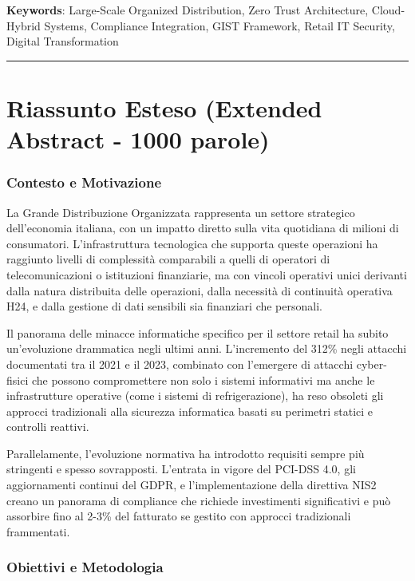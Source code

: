 \documentclass{report}
\begin{document}
\textbf{Keywords}: Large-Scale Organized Distribution, Zero Trust
Architecture, Cloud-Hybrid Systems, Compliance Integration, GIST
Framework, Retail IT Security, Digital Transformation

\begin{center}\rule{0.5\linewidth}{0.5pt}\end{center}

\section{Riassunto Esteso (Extended Abstract - 1000
parole)}\label{riassunto-esteso-extended-abstract---1000-parole}

\subsubsection{Contesto e Motivazione}\label{contesto-e-motivazione}

La Grande Distribuzione Organizzata rappresenta un settore strategico
dell'economia italiana, con un impatto diretto sulla vita quotidiana di
milioni di consumatori. L'infrastruttura tecnologica che supporta queste
operazioni ha raggiunto livelli di complessità comparabili a quelli di
operatori di telecomunicazioni o istituzioni finanziarie, ma con vincoli
operativi unici derivanti dalla natura distribuita delle operazioni,
dalla necessità di continuità operativa H24, e dalla gestione di dati
sensibili sia finanziari che personali.

Il panorama delle minacce informatiche specifico per il settore retail
ha subito un'evoluzione drammatica negli ultimi anni. L'incremento del
312\% negli attacchi documentati tra il 2021 e il 2023, combinato con
l'emergere di attacchi cyber-fisici che possono compromettere non solo i
sistemi informativi ma anche le infrastrutture operative (come i sistemi
di refrigerazione), ha reso obsoleti gli approcci tradizionali alla
sicurezza informatica basati su perimetri statici e controlli reattivi.

Parallelamente, l'evoluzione normativa ha introdotto requisiti sempre
più stringenti e spesso sovrapposti. L'entrata in vigore del PCI-DSS
4.0, gli aggiornamenti continui del GDPR, e l'implementazione della
direttiva NIS2 creano un panorama di compliance che richiede
investimenti significativi e può assorbire fino al 2-3\% del fatturato
se gestito con approcci tradizionali frammentati.

\subsubsection{Obiettivi e Metodologia}\label{obiettivi-e-metodologia}
\end{document}
